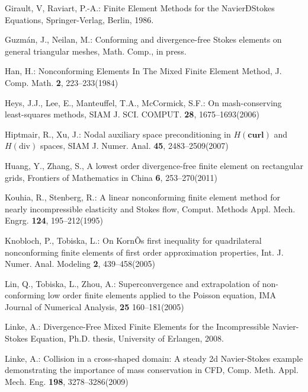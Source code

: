 \documentclass[12pt,showkeys]{amsart}
\begin{document}
\begin{thebibliography}{000}
\newblock Girault, V, Raviart, P.-A.: 
\rm{Finite Element Methods for the NavierÐStokes Equations},
Springer-Verlag, Berlin, 1986.

\newblock Guzm\'an, J., Neilan, M.: 
\rm{Conforming and divergence-free Stokes elements on general triangular meshes}, Math. Comp., in press.

\newblock Han, H.:
\rm{Nonconforming Elements In The Mixed Finite Element Method}, J. Comp. Math. \textbf{2}, 223--233(1984)

\newblock Heys, J.J., Lee, E., Manteuffel, T.A., McCormick, S.F.:
\rm{On mash-conserving least-squares methods}, SIAM J. SCI. COMPUT. \textbf{28}, 1675--1693(2006)

\newblock Hiptmair, R., Xu, J.:
\rm{Nodal auxiliary space preconditioning in $H(\mathbf{curl})$ and $H(\mathrm{div})$ spaces}, SIAM J. Numer. Anal. \textbf{45}, 2483--2509(2007)

\newblock Huang, Y., Zhang, S.,
\rm{A lowest order divergence-free finite element on rectangular grids}, Frontiers of Mathematics in China \textbf{6}, 253--270(2011)

\newblock Kouhia, R., Stenberg, R.: 
\rm{A linear nonconforming finite element method for nearly incompressible elasticity and Stokes flow}, Comput. Methods Appl. Mech. Engrg. \textbf{124}, 195--212(1995)

\newblock Knobloch, P., Tobiska, L.:
\rm{On KornÕs first inequality for quadrilateral nonconforming finite elements of first order approximation properties}, Int. J. Numer. Anal. Modeling \textbf{2}, 439--458(2005) 

\newblock Lin, Q., Tobiska, L., Zhou, A.:
\rm{Superconvergence and extrapolation of non-conforming low order finite elements applied to the Poisson equation}, IMA Journal of Numerical Analysis, \textbf{25} 160--181(2005)

\newblock Linke, A.: 
\rm{Divergence-Free Mixed Finite Elements for the Incompressible Navier-Stokes Equation}, Ph.D. thesis, University of Erlangen, 2008.

\newblock Linke, A.: 
\rm{Collision in a cross-shaped domain: A steady 2d Navier-Stokes example demonstrating the importance of mass conservation in CFD}, Comp. Meth. Appl. Mech. Eng. \textbf{198}, 3278--3286(2009)


\end{thebibliography}
\end{document}
